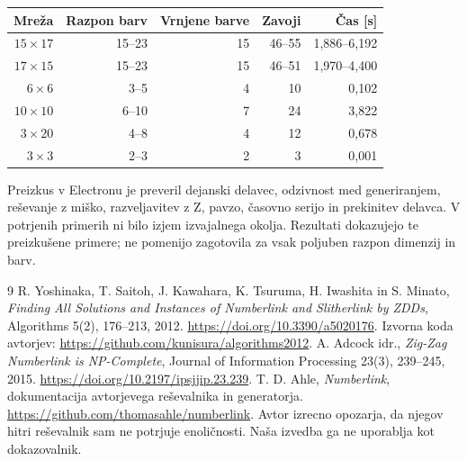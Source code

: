 \documentclass[12pt,a4paper]{article}
\begin{document}
\begin{center}
\begin{tabular}{rrrrr}
\toprule
Mreža & Razpon barv & Vrnjene barve & Zavoji & Čas [s]\\
\midrule
\(15\times17\) & 15--23 & 15 & 46--55 & 1,886--6,192\\
\(17\times15\) & 15--23 & 15 & 46--51 & 1,970--4,400\\
\(6\times6\) & 3--5 & 4 & 10 & 0,102\\
\(10\times10\) & 6--10 & 7 & 24 & 3,822\\
\(3\times20\) & 4--8 & 4 & 12 & 0,678\\
\(3\times3\) & 2--3 & 2 & 3 & 0,001\\
\bottomrule
\end{tabular}
\end{center}

Preizkus v Electronu je preveril dejanski delavec, odzivnost med generiranjem, reševanje z miško, razveljavitev z Z, pavzo, časovno serijo in prekinitev delavca. V potrjenih primerih ni bilo izjem izvajalnega okolja. Rezultati dokazujejo te preizkušene primere; ne pomenijo zagotovila za vsak poljuben razpon dimenzij in barv.

\begin{thebibliography}{9}
 R. Yoshinaka, T. Saitoh, J. Kawahara, K. Tsuruma, H. Iwashita in S. Minato, \emph{Finding All Solutions and Instances of Numberlink and Slitherlink by ZDDs}, Algorithms 5(2), 176--213, 2012. \url{https://doi.org/10.3390/a5020176}. Izvorna koda avtorjev: \url{https://github.com/kunisura/algorithms2012}.
 A. Adcock idr., \emph{Zig-Zag Numberlink is NP-Complete}, Journal of Information Processing 23(3), 239--245, 2015. \url{https://doi.org/10.2197/ipsjjip.23.239}.
 T. D. Ahle, \emph{Numberlink}, dokumentacija avtorjevega reševalnika in generatorja. \url{https://github.com/thomasahle/numberlink}. Avtor izrecno opozarja, da njegov hitri reševalnik sam ne potrjuje enoličnosti. Naša izvedba ga ne uporablja kot dokazovalnik.
\end{thebibliography}
\end{document}
